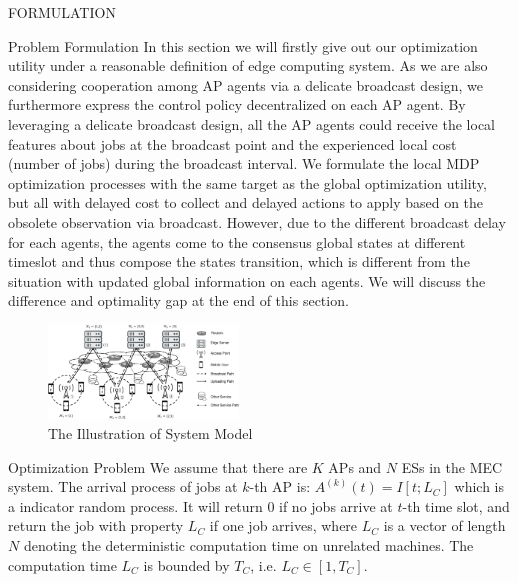 \documentclass[10pt, conference, letterpaper]{IEEEtran}
\begin{document}
\begin{section}{FORMULATION}
        \begin{subsection}{Problem Formulation}
            In this section we will firstly give out our optimization utility under a reasonable definition of edge computing system. As we are also considering cooperation among AP agents via a delicate broadcast design, we furthermore express the control policy decentralized on each AP agent.
            By leveraging a delicate broadcast design, all the AP agents could receive the local features about jobs at the broadcast point and the experienced local cost (number of jobs) during the broadcast interval.
            We formulate the local MDP optimization processes with the same target as the global optimization utility, but all with delayed cost to collect and delayed actions to apply based on the obsolete observation via broadcast. However, due to the different broadcast delay for each agents, the agents come to the consensus global states at different timeslot and thus compose the states transition, which is different from the situation with updated global information on each agents. We will discuss the difference and optimality gap at the end of this section.

            \begin{figure}[h]
                \centering
                \includegraphics[width=0.45\textwidth, trim={0.5cm 0.5cm 0.5cm 0.5cm}, clip]{system-model.pdf}
                \caption{The Illustration of System Model}
                \label{fig:system}
            \end{figure}

            \begin{subsubsection}{Optimization Problem}
                We assume that there are $K$ APs and $N$ ESs in the MEC system.
                The arrival process of jobs at $k$-th AP is: $A^{(k)}(t)=I[t; L_C]$ which is a indicator random process. It will return $0$ if no jobs arrive at $t$-th time slot, and return the job with property $L_C$ if one job arrives, where $L_C$ is a vector of length $N$ denoting the deterministic computation time on unrelated machines.
                The computation time $L_C$ is bounded by $T_C$, i.e. $L_C \in [1,T_C]$.
                

\end{subsubsection}
\end{subsection}
\end{section}
\end{document}

